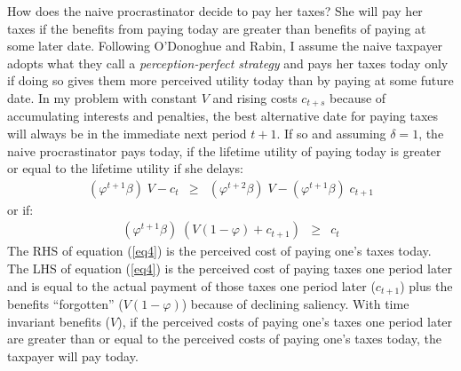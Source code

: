 How does the naive procrastinator decide to pay her taxes?  She will
pay her taxes if the benefits from paying today are greater than
benefits of paying at some later date.  Following O'Donoghue and
Rabin, I assume the naive taxpayer adopts what they call a
\textit{perception-perfect strategy} and pays her taxes today only if
doing so gives them more perceived utility today than by paying at
some future date.  In my problem with constant $V$ and rising costs
$c_{t+s}$ because of accumulating interests and penalties, the best
alternative date for paying taxes will always be in the immediate next
period $ t + 1$.  If so and assuming $\delta=1$, the naive
procrastinator pays today, if the lifetime utility of paying today is
greater or equal to the lifetime utility if she delays:
\begin{eqnarray}\label{eq3}
(\varphi^{t+1} \beta) \; V - c_ t &\ge& (\varphi^{t+2} \beta) \; V -
  (\varphi^{t+1} \beta) \; c_ {t+1}
\end{eqnarray}
or if: 
\begin{eqnarray}\label{eq4}
(\varphi^{t+1} \beta) \; (V (1-\varphi) + c_{t+1}) &\ge& c_ {t}
\end{eqnarray}
The RHS of equation (\ref{eq4}) is the perceived cost of paying one's
taxes today.  The LHS of equation (\ref{eq4}) is the perceived cost of
paying taxes one period later and is equal to the actual payment of
those taxes one period later ($c_{t+1}$) plus the benefits
``forgotten'' ($V(1 - \varphi)$) because of declining saliency. With time invariant benefits ($V$), if
the perceived costs of paying one's taxes one period later are greater
than or equal to the perceived costs of paying one's taxes today, the
taxpayer will pay today.

